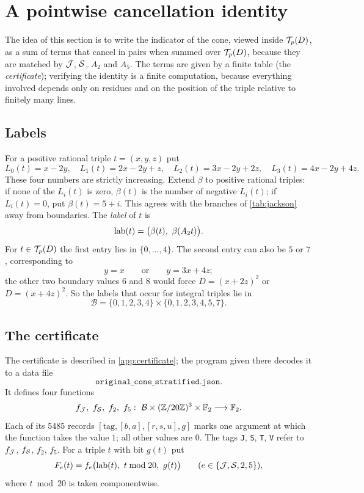 \section{A pointwise cancellation identity}\label{sec:certificate}

The idea of this section is to write the indicator of the cone, viewed inside
$\mathcal T_p(D)$, as a sum of terms that cancel in pairs when summed over
$\mathcal T_p(D)$, because they are matched by $\mathcal J$, $\mathcal S$, $A_2$ and $A_5$. The
terms are given by a finite table (the \emph{certificate}); verifying the
identity is a finite computation, because everything involved depends only on
residues and on the position of the triple relative to finitely many lines.

\subsection{Labels}
For a positive rational triple $t=(x,y,z)$ put
\[
  L_0(t)=x-2y,\quad L_1(t)=2x-2y+z,\quad L_2(t)=3x-2y+2z,\quad L_3(t)=4x-2y+4z .
\]
These four numbers are strictly increasing. Extend $\beta$ to positive rational
triples: if none of the $L_i(t)$ is zero, $\beta(t)$ is the number of negative
$L_i(t)$; if $L_i(t)=0$, put $\beta(t)=5+i$. This agrees with the branches of
\cref{tab:jackson} away from boundaries. The \emph{label} of $t$ is
\[
  \lab(t)=\bigl(\beta(t),\ \beta(A_2t)\bigr).
\]
For $t\in\mathcal T_p(D)$ the first entry lies in $\{0,\dots,4\}$. The second entry
can also be $5$ or $7$, corresponding to
\begin{equation}\label{eq:boundary-labels}
  y=x\qquad\text{or}\qquad y=3x+4z ;
\end{equation}
the other two boundary values $6$ and $8$ would force $D=(x+2z)^2$ or
$D=(x+4z)^2$. So the labels that occur for integral triples lie in
\[
  \mathcal B=\{0,1,2,3,4\}\times\{0,1,2,3,4,5,7\}.
\]

\subsection{The certificate}
The certificate is described in \cref{app:certificate}; the program given there
decodes it to a data file
\[
  \texttt{original\_cone\_stratified.json}.
\]
It defines four functions
\[
  f_{\Jk},\ f_{\Sw},\ f_2,\ f_5:\ \mathcal B\times(\Z/20\Z)^3\times\F_2\longrightarrow\F_2 .
\]
Each of its $5485$ records $[\text{tag},[b,a],[r,s,u],g]$ marks one argument at
which the function takes the value $1$; all other values are $0$. The tags
\texttt{J}, \texttt{S}, \texttt{T}, \texttt{V} refer to $f_{\mathcal J}$, $f_{\mathcal S}$, $f_2$,
$f_5$. For a triple $t$ with bit $g(t)$ put
\[
  F_e(t)=f_e\bigl(\lab(t),\ t\bmod20,\ g(t)\bigr)\qquad(e\in\{\Jk,\Sw,2,5\}),
\]
where $t\bmod 20$ is taken componentwise.

